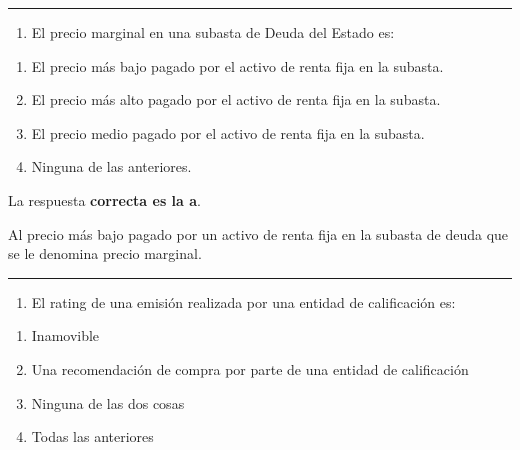 \documentclass[
  letterpaper,
  DIV=11,
  numbers=noendperiod]{scrreprt}
\providecommand{\tightlist}{%
  \setlength{\itemsep}{0pt}\setlength{\parskip}{0pt}}\usepackage{longtable,booktabs,array}
\begin{document}
\begin{center}\rule{0.5\linewidth}{0.5pt}\end{center}

\begin{enumerate}
\def\labelenumi{\arabic{enumi}.}
\setcounter{enumi}{76}
\tightlist
\item
  El precio marginal en una subasta de Deuda del Estado es:
\end{enumerate}

\begin{enumerate}
\def\labelenumi{\alph{enumi})}
\item
  El precio más bajo pagado por el activo de renta fija en la subasta.
\item
  El precio más alto pagado por el activo de renta fija en la subasta.
\item
  El precio medio pagado por el activo de renta fija en la subasta.
\item
  Ninguna de las anteriores.
\end{enumerate}

\begin{tcolorbox}[enhanced jigsaw, left=2mm, opacityback=0, colback=white, breakable, arc=.35mm, bottomrule=.15mm, rightrule=.15mm, toprule=.15mm, leftrule=.75mm, colframe=quarto-callout-tip-color-frame]
\begin{minipage}[t]{5.5mm}
\textcolor{quarto-callout-tip-color}{\faLightbulb}
\end{minipage}%
\begin{minipage}[t]{\textwidth - 5.5mm}

La respuesta \textbf{correcta es la a}.

Al precio más bajo pagado por un activo de renta fija en la subasta de
deuda que se le denomina precio marginal.

\end{minipage}%
\end{tcolorbox}

\begin{center}\rule{0.5\linewidth}{0.5pt}\end{center}

\begin{enumerate}
\def\labelenumi{\arabic{enumi}.}
\setcounter{enumi}{77}
\tightlist
\item
  El rating de una emisión realizada por una entidad de calificación es:
\end{enumerate}

\begin{enumerate}
\def\labelenumi{\alph{enumi})}
\item
  Inamovible
\item
  Una recomendación de compra por parte de una entidad de calificación
\item
  Ninguna de las dos cosas
\item
  Todas las anteriores
\end{enumerate}
\end{document}
